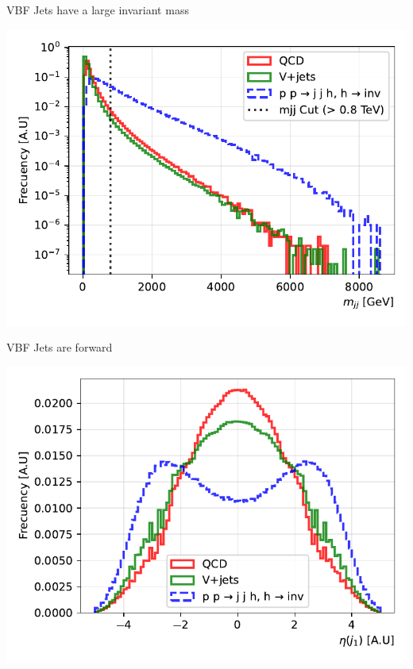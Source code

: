 \documentclass{../../bredelebeamer}
\begin{document}
\begin{frame}{VBF Jets have a large invariant mass}
    \begin{minipage}{0.97\textwidth}
        \includegraphics[width=\textwidth]{../Images/dijet_mass_comparison.pdf}
    \end{minipage}
    
\end{frame}

\begin{frame}{VBF Jets are forward}
    \begin{minipage}{0.97\textwidth}
        \includegraphics[width=\textwidth]{../Images/leading_jet_eta_comparison.pdf}
    \end{minipage}
\end{frame}
\end{document}
